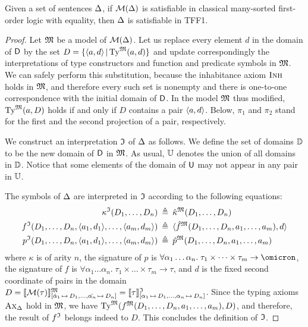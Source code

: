 \begin{theorem} \label{thm:mon_compl}
Given a set of sentences $\mathrm{\Delta}$, if $\mathcal{M}(\mathrm{\Delta})$
is satisfiable in classical many-sorted first-order logic
with equality, then $\mathrm{\Delta}$ is satisfiable in TFF1.
\end{theorem}
\begin{proof}
Let $\mathfrak{M}$ be a model of $\mathcal{M}(\mathrm{\Delta})$. Let us replace every element $d$ in
the domain of $\mathsf{D}$ by the set $D = \{\langle a,d \rangle \,|\, \mathrm{Ty}^{\mathfrak{M}}(a,d)\}$
and update correspondingly the interpretations of type constructors
and function and predicate symbols in $\mathfrak{M}$.
We can safely perform this substitution, because the inhabitance
axiom $\text{\sc Inh}$ holds in $\mathfrak{M}$, and therefore every such set is nonempty
and there is one-to-one correspondence with the initial domain of $\mathsf{D}$.
In the model $\mathfrak{M}$ thus modified, $\mathrm{Ty}^{\mathfrak{M}}(a,D)$ holds if and only if
$D$ contains a pair $\langle a,d \rangle$.
%
Below, $\pi_1$ and $\pi_2$ stand for the first and the second projection
of a pair, respectively.

We construct an interpretation $\mathfrak{I}$ of $\mathrm{\Delta}$ as follows.
We define the set of domains $\mathbb{D}$ to be the new domain
of $\mathsf{D}$ in $\mathfrak{M}$. As usual, $\mathbb{U}$ denotes the union
of all domains in $\mathbb{D}$. Notice that some elements of
the domain of $\mathsf{U}$ may not appear in any pair in $\mathbb{U}$.

The symbols of $\mathrm{\Delta}$ are interpreted in $\mathfrak{I}$
according to the following equations:
\begin{align*}
\kappa^{\mathfrak{I}}(D_1,\dots,D_n) &\:\triangleq\: \hat{\kappa}^{\mathfrak{M}}(D_1,\dots,D_n) \\
f^{\mathfrak{I}}(D_1,\dots,D_n,\langle a_1,d_1 \rangle,\dots,\langle a_m,d_m \rangle) &\:\triangleq\:
\langle \hat{f}^{\mathfrak{M}}(D_1,\dots,D_n,a_1,\dots,a_m), d \rangle \\
p^{\mathfrak{I}}(D_1,\dots,D_n,\langle a_1,d_1 \rangle,\dots,\langle a_m,d_m \rangle) &\:\triangleq\:
\hat{p}^{\mathfrak{M}}(D_1,\dots,D_n,a_1,\dots,a_m)
\end{align*}
where
$\kappa$ is of arity $n$,
the signature of $p$ is
$\forall \alpha_1\dots\alpha_n .\; \tau_1 \times \dots \times \tau_m \to
\omicron$,
the signature of $f$ is
$\forall \alpha_1\dots\alpha_n .\; \tau_1 \times \dots \times \tau_m \to \tau$,
and $d$ is the fixed second coordinate of pairs in the domain
$D = \llbracket \mathcal{M}(\tau) \rrbracket^{\mathfrak{M}}_{[\hat{\alpha}_1\,\mapsto\,D_1,\dots,
\hat{\alpha_n}\,\mapsto\,D_n]} =
\llbracket \tau \rrbracket^{\mathfrak{I}}_{[\alpha_1\,\mapsto\,D_1,\dots,\alpha_n\,\mapsto\,D_n]}$.
Since the typing axioms $\text{\sc Ax}_{\mathrm{\Delta}}$ hold in $\mathfrak{M}$, we have
$\mathrm{Ty}^{\mathfrak{M}}(f^{\mathfrak{M}}(D_1,\dots,D_n,a_1,\dots,a_m), D)$,
and therefore, the result of $f^{\mathfrak{I}}$ belongs indeed to $D$.
This concludes the definition of $\mathfrak{I}$.


\end{proof}
